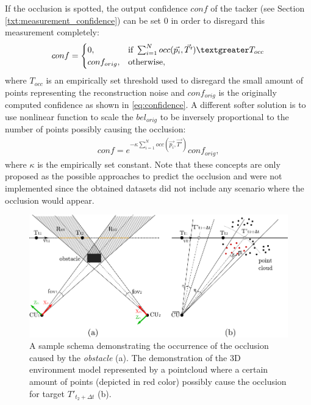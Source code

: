 If the occlusion is spotted, the output confidence $conf$ of the tacker (see Section \ref{txt:measurement_confidence}) can be set $0$ in order to disregard this measurement completely:
\begin{align}
conf = 
	\begin{cases}
		0, & \text{if}\ \sum_{i=1}^{N}{occ(\vec{p_{i}}, \vec{T'})} \textgreater T_{occ} \\		
		conf_{orig}, & \text{otherwise},
	\end{cases}
\end{align}
where $T_{occ}$ is an empirically set threshold used to disregard the small amount of points representing the reconstruction noise and $conf_{orig}$ is the originally computed confidence as shown in \ref{eq:confidence}. A different softer solution is to use nonlinear function to scale the $bel_{orig}$ to be inversely proportional to the number of points possibly causing the occlusion:
\begin{align}
conf = e^{-\kappa \sum_{i=1}^{N}{occ(\vec{p_{i}}, \vec{T'})}}conf_{orig},
\end{align}
where $\kappa$ is the empirically set constant. Note that these concepts are only proposed as the possible approaches to predict the occlusion and were not implemented since the obtained datasets did not include any scenario where the occlusion would appear.

\begin{figure}[htb]
	\centering
	\includegraphics[width=0.95\linewidth]{fig/occlusion_2_units_pointcloud.pdf}
	\caption{A sample schema demonstrating the occurrence of the occlusion caused by the \textit{obstacle} (a). The demonstration of the 3D environment model represented by a pointcloud where a certain amount of points (depicted in red color) possibly cause the occlusion for target $T'_{t_{2}+\Delta t}$ (b).}
	\label{fig:occlusion_prediciton}
\end{figure}

